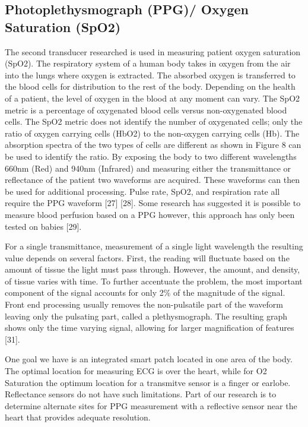\subsection{Photoplethysmograph (PPG)/ Oxygen Saturation (SpO2)}
The second transducer researched is used in measuring patient oxygen saturation (SpO2). The respiratory system of a human body takes in oxygen from the air into the lungs where oxygen is extracted. The absorbed oxygen is transferred to the blood cells for distribution to the rest of the body. Depending on the health of a patient, the level of oxygen in the blood at any moment can vary. The SpO2 metric is a percentage of oxygenated blood cells versus non-oxygenated blood cells. The SpO2 metric does not identify the number of oxygenated cells; only the ratio of oxygen carrying cells (HbO2) to the non-oxygen carrying cells (Hb). The absorption spectra of the two types of cells are different as shown in Figure 8 can be used to identify the ratio. By exposing the body to two different wavelengths 660nm (Red) and 940nm (Infrared) and measuring either the transmittance or reflectance of the patient two waveforms are acquired. These waveforms can then be used for additional processing. Pulse rate, SpO2, and respiration rate all require the PPG waveform [27] [28].  Some research has suggested it is possible to measure blood perfusion based on a PPG however, this approach has only been tested on babies [29].

For a single transmittance, measurement of a single light wavelength the resulting value depends on several factors. First, the reading will fluctuate based on the amount of tissue the light must pass through. However, the amount, and density, of tissue varies with time. To further accentuate the problem, the most important component of the signal accounts for only 2\% of the magnitude of the signal. Front end processing usually removes the non-pulsatile part of the waveform leaving only the pulsating part, called a plethysmograph. The resulting graph shows only the time varying signal, allowing for larger magnification of features [31].

One goal we have is an integrated smart patch located in one area of the body. The optimal location for measuring ECG is over the heart, while for O2 Saturation the optimum location for a transmitve sensor is a finger or earlobe. Reflectance sensors do not have such limitations. Part of our research is to determine alternate sites for PPG measurement with a reflective sensor near the heart that provides adequate resolution.

